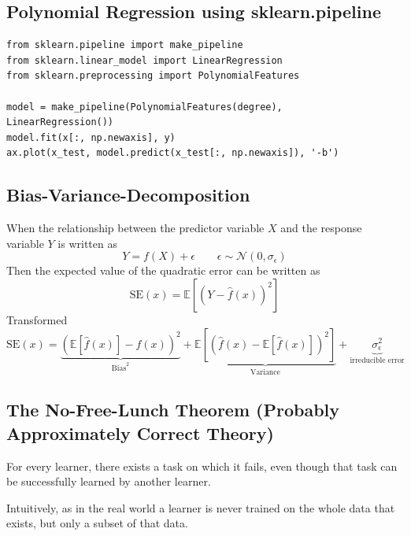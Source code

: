 \documentclass[11pt]{article}
\theoremstyle{definition}
\newcommand*\ev[1]{\mathrel{\mathbb{E}\left[#1\right]}}
\newcommand*\N[1]{\mathcal{N}\left(#1\right)}
\begin{document}
\subsection{Polynomial Regression using sklearn.pipeline}
\begin{verbatim}
from sklearn.pipeline import make_pipeline
from sklearn.linear_model import LinearRegression
from sklearn.preprocessing import PolynomialFeatures

model = make_pipeline(PolynomialFeatures(degree),
LinearRegression())
model.fit(x[:, np.newaxis], y)
ax.plot(x_test, model.predict(x_test[:, np.newaxis]), '-b')
\end{verbatim}

\subsection{Bias-Variance-Decomposition}
When the relationship between the predictor variable $X$ and the response variable $Y$ is written as
\begin{equation*}
	Y=f(X) + \epsilon \qquad \epsilon\sim\N{0,\sigma_{\epsilon}}
\end{equation*}
Then the expected value of the quadratic error can be written as
\begin{equation*}
	\text{SE}(x) = \ev{(Y - \hat{f}(x))^2}
\end{equation*}
Transformed
\begin{equation*}
	\text{SE}(x) = \underbrace{\left(\ev{\hat{f}(x)} - f(x)\right)^2}_{\text{Bias}^2} + \underbrace{\ev{\left(\hat{f}(x) - \ev{\hat{f}(x)}\right)^2}}_{\text{Variance}} + \underbrace{\sigma_{\epsilon}^2}_{\text{irreducible error}}
\end{equation*}

\subsection{The No-Free-Lunch Theorem (Probably Approximately Correct Theory)}
\begin{theorem}
	For every learner, there exists a task on which it fails, even though that task can be successfully learned by another learner.
\end{theorem}
Intuitively, as in the real world a learner is never trained on the whole data that exists, but only a subset of that data.
\end{document}
